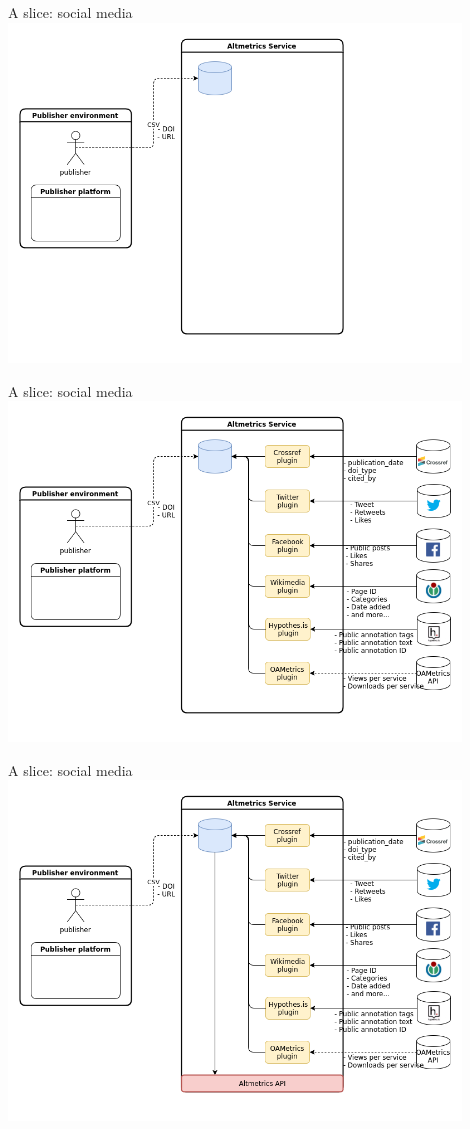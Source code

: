 \documentclass[xcolor=svgnames]{beamer}
\begin{document}
        \begin{frame}{A slice: social media}
            \includegraphics[width=0.9\textwidth]{img/h2}
        \end{frame}

        \begin{frame}{A slice: social media}
            \includegraphics[width=0.9\textwidth]{img/h3}
        \end{frame}

        \begin{frame}{A slice: social media}
            \includegraphics[width=0.9\textwidth]{img/h4}
        \end{frame}
\end{document}
